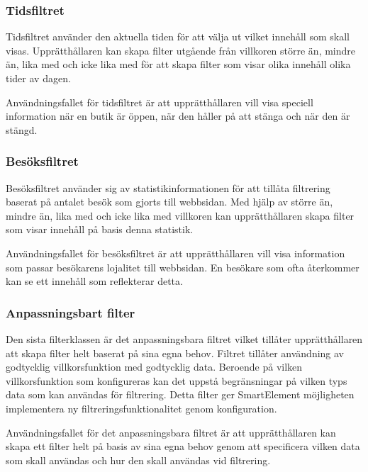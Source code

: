 \subsubsection{Tidsfiltret}

Tidsfiltret använder den aktuella tiden för att välja ut vilket innehåll som skall visas. Upprätthållaren kan skapa filter utgående från villkoren större än, mindre än, lika med och icke lika med för att skapa filter som visar olika innehåll olika tider av dagen.

Användningsfallet för tidsfiltret är att upprätthållaren vill visa speciell information när en butik är öppen, när den håller på att stänga och när den är stängd.

\subsubsection{Besöksfiltret}

Besöksfiltret använder sig av statistikinformationen för att tillåta filtrering baserat på antalet besök som gjorts till webbsidan. Med hjälp av större än, mindre än, lika med och icke lika med villkoren kan upprätthållaren skapa filter som visar innehåll på basis denna statistik.

Användningsfallet för besöksfiltret är att upprätthållaren vill visa information som passar besökarens lojalitet till webbsidan. En besökare som ofta återkommer kan se ett innehåll som reflekterar detta.

\subsubsection{Anpassningsbart filter}

Den sista filterklassen är det anpassningsbara filtret vilket tillåter upprätthållaren att skapa filter helt baserat på sina egna behov. Filtret tillåter användning av godtycklig villkorsfunktion med godtycklig data. Beroende på vilken villkorsfunktion som konfigureras kan det uppstå begränsningar på vilken typs data som kan användas för filtrering. Detta filter ger SmartElement möjligheten implementera ny filtreringsfunktionalitet genom konfiguration.

Användningsfallet för det anpassningsbara filtret är att upprätthållaren kan skapa ett filter helt på basis av sina egna behov genom att specificera vilken data som skall användas och hur den skall användas vid filtrering.

